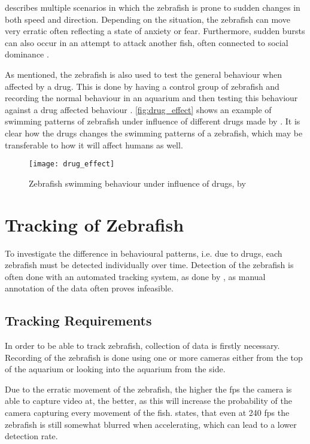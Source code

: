 \cite{Kalueff2013} describes multiple scenarios in which the zebrafish is prone to sudden changes in both speed and direction. Depending on the situation, the zebrafish can move very erratic often reflecting a state of anxiety or fear. Furthermore, sudden bursts can also occur in an attempt to attack another fish, often connected to social dominance \citep{Kalueff2013}.

As mentioned, the zebrafish is also used to test the general behaviour when affected by a drug. This is done by having a control group of zebrafish and recording the normal behaviour in an aquarium and then testing this behaviour against a drug affected behaviour \citep{Stewart2015}. \autoref{fig:drug_effect} shows an example of swimming patterns of zebrafish under influence of different drugs made by \cite{Stewart2015}. It is clear how the drugs changes the swimming patterns of a zebrafish, which may be transferable to how it will affect humans as well.\\ 

\begin{figure}[h]
	\centering
	\texttt{[image: drug\_effect]}
	\caption{Zebrafish swimming behaviour under influence of drugs, by \cite{Stewart2015}}
	\label{fig:drug_effect}
\end{figure}


\section{Tracking of Zebrafish}

To investigate the difference in behavioural patterns, i.e. due to drugs, each zebrafish must be detected individually over time. Detection of the zebrafish is often done with an automated tracking system, as done by \cite{Stewart2015}, as manual annotation of the data often proves infeasible.

\subsection{Tracking Requirements}
In order to be able to track zebrafish, collection of data is firstly necessary. Recording of the zebrafish is done using one or more cameras either from the top of the aquarium or looking into the aquarium from the side.

Due to the erratic movement of the zebrafish, the higher the \gls{fps} the camera is able to capture video at, the better, as this will increase the probability of the camera capturing every movement of the fish. \cite{Pedersen2017} states, that even at 240 \gls{fps} the zebrafish is still somewhat blurred when accelerating, which can lead to a lower detection rate.


